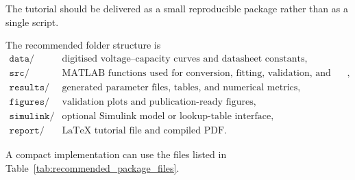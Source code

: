\documentclass[a4paper,12pt]{article}
\begin{document}
The tutorial should be delivered as a small reproducible package rather than as a single script.

The recommended folder structure is
\[
\begin{array}{ll}
\texttt{data/}      & \text{digitised voltage--capacity curves and datasheet constants},\\
\texttt{src/}       & \text{MATLAB functions used for conversion, fitting, validation, and export},\\
\texttt{results/}   & \text{generated parameter files, tables, and numerical metrics},\\
\texttt{figures/}   & \text{validation plots and publication-ready figures},\\
\texttt{simulink/}  & \text{optional Simulink model or lookup-table interface},\\
\texttt{report/}    & \text{LaTeX tutorial file and compiled PDF}.
\end{array}
\]

A compact implementation can use the files listed in Table~\ref{tab:recommended_package_files}.
\end{document}
